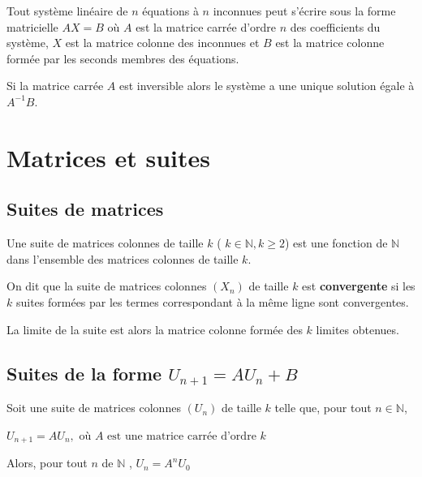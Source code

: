 \documentclass[french]{book}
\begin{document}
   Tout système linéaire de $n$ équations à $n$ inconnues peut s'écrire sous la forme matricielle $AX=B$ où $A$ est la matrice carrée d'ordre $n$ des coefficients du système, $X$ est la matrice colonne des inconnues et $B$ est la matrice colonne formée par les seconds membres des équations.
   
   Si la matrice carrée $A$ est inversible alors le système a une unique solution égale à $A^{-1}B$.
   
\section{Matrices et suites }
\subsection{Suites de matrices}

Une suite de matrices colonnes de taille $k$ ( $k \in \mathbb{N}, k\geq 2$) est une fonction de $\mathbb{N}$ dans l'ensemble des matrices colonnes de taille $k$.

\begin{defn}

On dit que la suite de matrices colonnes $(X_{n})$ de taille $k$ est \textbf{convergente} si les $k$ suites formées par les termes correspondant à la même ligne sont convergentes.

La limite de la suite est alors la matrice colonne formée des $k$ limites obtenues.
\end{defn}

\subsection{Suites de la forme $U_{n+1}=AU_{n}+B$}

\begin{prop}

Soit une suite de matrices colonnes $(U_{n})$ de taille $k$ telle que, pour tout $n \in \mathbb{N}$,

\begin{center}
$\boxed{U_{n+1}=AU_{n}, \text{ où } A \text{ est une matrice carrée d'ordre }k}$
\end{center}

Alors, pour tout $n$ de $\mathbb{N}$ , $\boxed{U_{n}=A^{n}U_{0}}$\\

\end{prop}

\begin{demo}
\vspace{3cm}
\end{demo}
\end{document}
